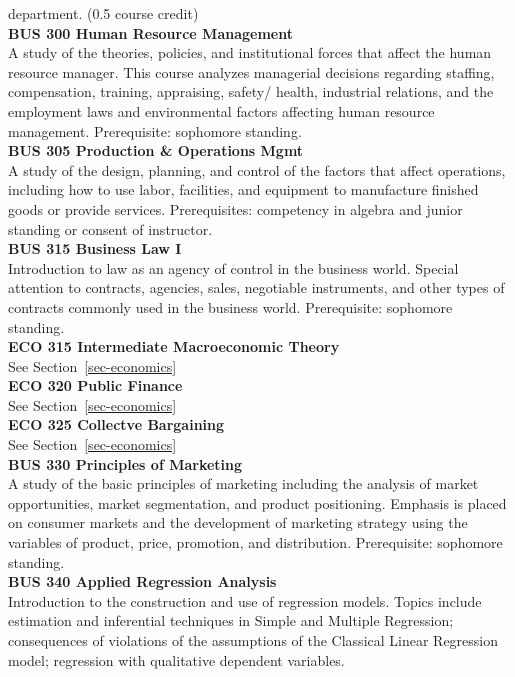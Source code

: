 \documentclass[
  letterpaper,
]{scrbook}
\begin{document}
department. (0.5 course credit)\\
\textbf{BUS 300 Human Resource Management}\\
A study of the theories, policies, and institutional forces that affect
the human resource manager. This course analyzes managerial decisions
regarding staffing, compensation, training, appraising, safety/ health,
industrial relations, and the employment laws and environmental factors
affecting human resource management. Prerequisite: sophomore standing.\\
\textbf{BUS 305 Production \& Operations Mgmt}\\
A study of the design, planning, and control of the factors that affect
operations, including how to use labor, facilities, and equipment to
manufacture finished goods or provide services. Prerequisites:
competency in algebra and junior standing or consent of instructor.\\
\textbf{BUS 315 Business Law I}\\
Introduction to law as an agency of control in the business world.
Special attention to contracts, agencies, sales, negotiable instruments,
and other types of contracts commonly used in the business world.
Prerequisite: sophomore standing.\\
\textbf{ECO 315 Intermediate Macroeconomic Theory}\\
See Section~\ref{sec-economics}\\
\textbf{ECO 320 Public Finance}\\
See Section~\ref{sec-economics}\\
\textbf{ECO 325 Collectve Bargaining}\\
See Section~\ref{sec-economics}\\
\textbf{BUS 330 Principles of Marketing}\\
A study of the basic principles of marketing including the analysis of
market opportunities, market segmentation, and product positioning.
Emphasis is placed on consumer markets and the development of marketing
strategy using the variables of product, price, promotion, and
distribution. Prerequisite: sophomore standing.\\
\textbf{BUS 340 Applied Regression Analysis}\\
Introduction to the construction and use of regression models. Topics
include estimation and inferential techniques in Simple and Multiple
Regression; consequences of violations of the assumptions of the
Classical Linear Regression model; regression with qualitative dependent
variables.\\
\end{document}
